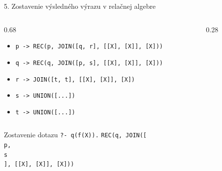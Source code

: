 \documentclass[11pt,aspectratio=169]{beamer}
\begin{document}
\begin{frame}{5. Zostavenie výsledného výrazu v relačnej algebre}
    \begin{columns}[T,onlytextwidth]
        \begin{column}{0.68\textwidth}
            \begin{itemize}
                \item \texttt{p -> REC(p, JOIN([q, r], [[X], [X]], [X]))}
                \item \texttt{q -> REC(q, JOIN([p, s], [[X], [X]], [X]))}
                \item \texttt{r -> JOIN([t, t], [[X], [X]], [X])}
                \item \texttt{s -> UNION([...])}
                \item \texttt{t -> UNION([...])}
            \end{itemize}
        \end{column}
        \begin{column}{0.28\textwidth}
            \begin{center}
            \end{center}
        \end{column}
    \end{columns}
\end{frame}

\begin{frame}{Zostavenie dotazu \texttt{?- q(f(X)).}}
    \texttt{REC(q, JOIN([\\
        \hspace{1em} p,\\
        \hspace{1em} s\\
        ], [[X], [X]], [X]))
    }
\end{frame}
\end{document}
